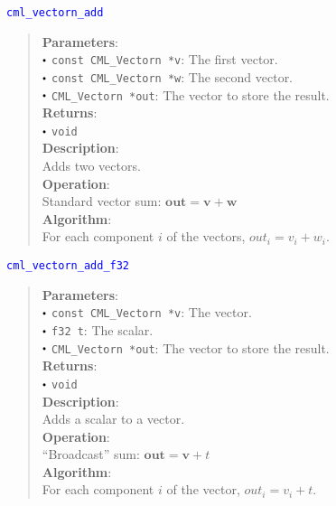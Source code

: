 \documentclass[a4paper,oneside,8pt]{extarticle}
\newcommand{\function}[1]{
  \noindent\textcolor{blue}{\texttt{#1}}
  \vspace{-0.3em}
}
\renewcommand{\dot}{\raisebox{0.3ex}{\scalebox{0.6}{$\bullet$}}}
\theoremstyle{definition}
\begin{document}
\function{cml\_vectorn\_add}
\begin{quote}
  \textbf{Parameters}: \\
  $\dot$ \texttt{const CML\_Vectorn *v}: The first vector. \\
  $\dot$ \texttt{const CML\_Vectorn *w}: The second vector. \\
  $\dot$ \texttt{CML\_Vectorn *out}: The vector to store the result. \\
  \textbf{Returns}: \\
  $\dot$ \texttt{void} \\

  \vspace{-0.75em}
  \textbf{Description}: \\
  Adds two vectors. \\

  \vspace{-0.75em}
  \textbf{Operation}: \\
  Standard vector sum: $\mathbf{out} = \mathbf{v} + \mathbf{w}$ \\

  \vspace{-0.75em}
  \textbf{Algorithm}: \\
  For each component $i$ of the vectors, $out_i = v_i + w_i$. \\
\end{quote}

\function{cml\_vectorn\_add\_f32}
\begin{quote}
  \textbf{Parameters}: \\
  $\dot$ \texttt{const CML\_Vectorn *v}: The vector. \\
  $\dot$ \texttt{f32 t}: The scalar. \\
  $\dot$ \texttt{CML\_Vectorn *out}: The vector to store the result. \\
  \textbf{Returns}: \\
  $\dot$ \texttt{void} \\

  \vspace{-0.75em}
  \textbf{Description}: \\
  Adds a scalar to a vector. \\

  \vspace{-0.75em}
  \textbf{Operation}: \\
  ``Broadcast'' sum: $\mathbf{out} = \mathbf{v} + t$ \\

  \vspace{-0.75em}
  \textbf{Algorithm}: \\
  For each component $i$ of the vector, $out_i = v_i + t$. \\
\end{quote}
\end{document}
